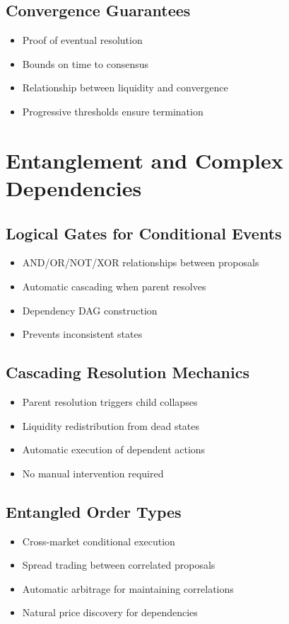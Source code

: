 \documentclass{article}
\begin{document}
\subsection{Convergence Guarantees}
\begin{itemize}
    \item Proof of eventual resolution
    \item Bounds on time to consensus
    \item Relationship between liquidity and convergence
    \item Progressive thresholds ensure termination
\end{itemize}

\section{Entanglement and Complex Dependencies}
\subsection{Logical Gates for Conditional Events}
\begin{itemize}
    \item AND/OR/NOT/XOR relationships between proposals
    \item Automatic cascading when parent resolves
    \item Dependency DAG construction
    \item Prevents inconsistent states
\end{itemize}

\subsection{Cascading Resolution Mechanics}
\begin{itemize}
    \item Parent resolution triggers child collapses
    \item Liquidity redistribution from dead states
    \item Automatic execution of dependent actions
    \item No manual intervention required
\end{itemize}

\subsection{Entangled Order Types}
\begin{itemize}
    \item Cross-market conditional execution
    \item Spread trading between correlated proposals
    \item Automatic arbitrage for maintaining correlations
    \item Natural price discovery for dependencies
\end{itemize}
\end{document}
